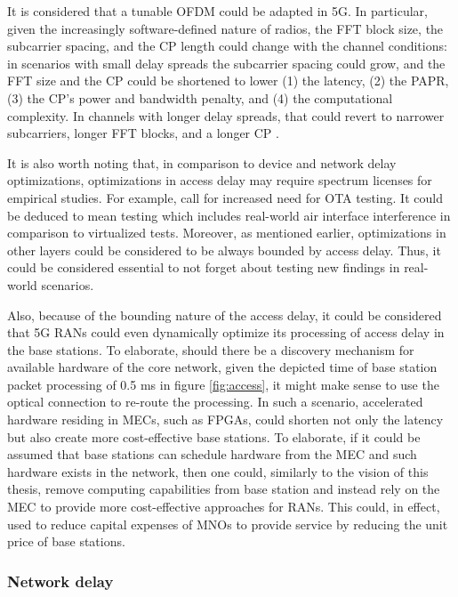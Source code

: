 \documentclass[12pt]{article}
\begin{document}
It is considered that a tunable \gls{OFDM} could be adapted in \gls{5G}. In particular, given the increasingly software-defined nature of radios, the \gls{FFT} block size, the subcarrier spacing, and the \gls{CP} length could change with the channel conditions: in scenarios with small delay spreads the subcarrier spacing could grow, and the \gls{FFT} size and the \gls{CP} could be shortened to lower (1) the latency, (2) the \gls{PAPR}, (3) the \gls{CP}'s power and bandwidth penalty, and (4) the computational complexity. In channels with longer delay spreads, that could revert to narrower subcarriers, longer \gls{FFT} blocks, and a longer \gls{CP} \cite{andrews2014will}.

It is also worth noting that, in comparison to device and network delay optimizations, optimizations in access delay may require spectrum licenses for empirical studies. For example, \cite{mezzavilla2018end, condoluci2016enabling, parvez2018survey} call for increased need for \gls{OTA} testing. It could be deduced to mean testing which includes real-world air interface interference in comparison to virtualized tests. Moreover, as mentioned earlier, optimizations in other layers could be considered to be always bounded by access delay. Thus, it could be considered essential to not forget about testing new findings in real-world scenarios.

Also, because of the bounding nature of the access delay, it could be considered that \gls{5G} \glspl{RAN} could even dynamically optimize its processing of access delay in the base stations. To elaborate, should there be a discovery mechanism for available hardware of the core network, given the depicted time of base station packet processing of 0.5 ms in figure \ref{fig:access}, it might make sense to use the optical connection to re-route the processing. In such a scenario, accelerated hardware residing in \glspl{MEC}, such as \glspl{FPGA}, could shorten not only the latency but also create more cost-effective base stations. To elaborate, if it could be assumed that base stations can schedule hardware from the \gls{MEC} and such hardware exists in the network, then one could, similarly to the vision of this thesis, remove computing capabilities from base station and instead rely on the \gls{MEC} to provide more cost-effective approaches for \glspl{RAN}. This could, in effect, used to reduce capital expenses of \glspl{MNO} to provide service by reducing the unit price of base stations.

\subsubsection{Network delay}
\end{document}
